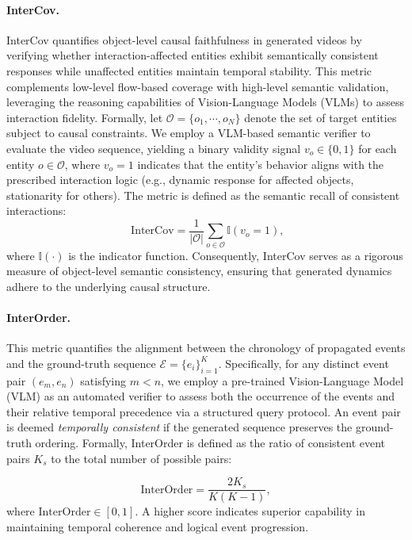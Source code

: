 \paragraph{InterCov.} 
InterCov quantifies object-level causal faithfulness in generated videos by verifying whether interaction-affected entities exhibit semantically consistent responses while unaffected entities maintain temporal stability. This metric complements low-level flow-based coverage with high-level semantic validation, leveraging the reasoning capabilities of Vision-Language Models (VLMs) to assess interaction fidelity. Formally, let $\mathcal{O} = \{o_1,\cdots, o_N\}$ denote the set of target entities subject to causal constraints. We employ a VLM-based semantic verifier to evaluate the video sequence, yielding a binary validity signal $v_o \in \{0,1\}$ for each entity $o \in \mathcal{O}$, where $v_o=1$ indicates that the entity's behavior aligns with the prescribed interaction logic (e.g., dynamic response for affected objects, stationarity for others). The metric is defined as the semantic recall of consistent interactions:
\begin{equation}
\text { InterCov}=\frac{1}{|\mathcal{O}|} \sum_{o \in \mathcal{O}} \mathbb{I}(v_o = 1),
\end{equation}
{where $\mathbb{I}(\cdot)$ is the indicator function. Consequently, InterCov serves as a rigorous measure of object-level semantic consistency, ensuring that generated dynamics adhere to the underlying causal structure.}
{\paragraph{InterOrder.} 
This metric quantifies the alignment between the chronology of propagated events and the ground-truth sequence $\mathcal{E}=\{e_i\}_{i=1}^{K}$. 
Specifically, for any distinct event pair $(e_m, e_n)$ satisfying $m<n$, we employ a pre-trained Vision-Language Model (VLM) as an automated verifier to assess both the occurrence of the events and their relative temporal precedence via a structured query protocol. 
An event pair is deemed \textit{temporally consistent} if the generated sequence preserves the ground-truth ordering. 
Formally, InterOrder is defined as the ratio of consistent event pairs $K_s$ to the total number of possible pairs:}
\begin{equation}
\mathrm{InterOrder} = \frac{2K_s}{K(K-1)},
\end{equation}
where $\mathrm{InterOrder} \in [0,1]$. 
A higher score indicates superior capability in maintaining temporal coherence and logical event progression.


